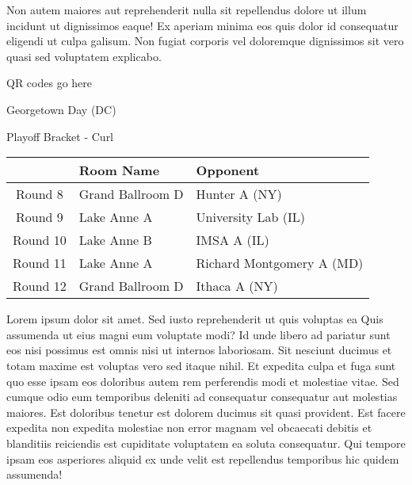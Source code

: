 \documentclass{article}%
\begin{document}
\newline%
Non autem maiores aut reprehenderit nulla sit repellendus dolore ut illum incidunt ut dignissimos eaque! Ex aperiam minima eos quis dolor id consequatur eligendi ut culpa galisum. Non fugiat corporis vel doloremque dignissimos sit vero quasi sed voluptatem explicabo.\newline%
\newline%
%
\vspace*{30pt}%
\begin{center}%
\begin{Huge}%
QR codes go here%
\end{Huge}%
\end{center}%
\newpage%
\begin{center}%
\begin{Huge}%
Georgetown Day (DC)%
\end{Huge}%
\vspace*{8pt}%
\linebreak%
\begin{Large}%
Playoff Bracket {-} Curl%
\end{Large}%
\end{center}%
\begin{tabularx}{\textwidth}{|c|Y|Y|}%
\hline%
&Room Name&Opponent\\%
\hline%
Round 8&Grand Ballroom D&Hunter A (NY)\\%
Round 9&Lake Anne A&University Lab (IL)\\%
Round 10&Lake Anne B&IMSA A (IL)\\%
Round 11&Lake Anne A&Richard Montgomery A (MD)\\%
Round 12&Grand Ballroom D&Ithaca A (NY)\\%
\hline%
\end{tabularx}%
\vspace*{8pt}%
\linebreak%
\newline%
\newline%
Lorem ipsum dolor sit amet. Sed iusto reprehenderit ut quis voluptas ea Quis assumenda ut eius magni eum voluptate modi? Id unde libero ad pariatur sunt eos nisi possimus est omnis nisi ut internos laboriosam. Sit nesciunt ducimus et totam maxime est voluptas vero sed itaque nihil. Et expedita culpa et fuga sunt quo esse ipsam eos doloribus autem rem perferendis modi et molestiae vitae.\newline%
\newline%
Sed cumque odio eum temporibus deleniti ad consequatur consequatur aut molestias maiores. Est doloribus tenetur est dolorem ducimus sit quasi provident. Est facere expedita non expedita molestiae non error magnam vel obcaecati debitis et blanditiis reiciendis est cupiditate voluptatem ea soluta consequatur. Qui tempore ipsam eos asperiores aliquid ex unde velit est repellendus temporibus hic quidem assumenda!\newline%
\end{document}
